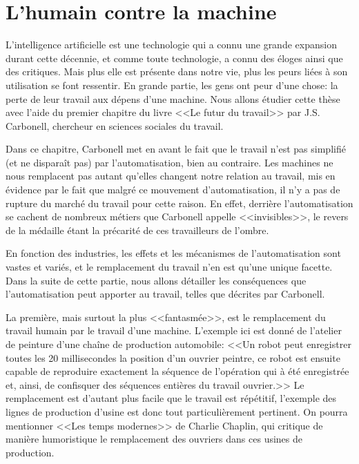 \documentclass[openany, 11pt]{memoir}
\begin{document}

\chapter{L'humain contre la machine}

L'intelligence artificielle est une technologie qui a connu une grande expansion durant cette décennie, et comme toute technologie, a connu des éloges ainsi que des critiques. Mais plus elle est présente dans notre vie, plus les peurs liées à son utilisation se font ressentir. En grande partie, les gens ont peur d'une chose: la perte de leur travail aux dépens d'une machine. Nous allons étudier cette thèse avec l'aide du premier chapitre du livre <<Le futur du travail>> \cite{futurtravail} par J.S. Carbonell, chercheur en sciences sociales du travail.

Dans ce chapitre, Carbonell met en avant le fait que le travail n'est pas simplifié (et ne disparaît pas) par l'automatisation, bien au contraire. Les machines ne nous remplacent pas autant qu'elles changent notre relation au travail, mis en évidence par le fait que malgré ce mouvement d'automatisation, il n'y a pas de rupture du marché du travail pour cette raison. En effet, derrière l'automatisation se cachent de nombreux métiers que Carbonell appelle <<invisibles>>, le revers de la médaille étant la précarité de ces travailleurs de l'ombre.

En fonction des industries, les effets et les mécanismes de l'automatisation sont vastes et variés, et le remplacement du travail n'en est qu'une unique facette. Dans la suite de cette partie, nous allons détailler les conséquences que l'automatisation peut apporter au travail, telles que décrites par Carbonell.

\bigskip
La première, mais surtout la plus <<fantasmée>>, est le remplacement du travail humain par le travail d'une machine. L'exemple ici est donné de l'atelier de peinture d'une chaîne de production automobile: <<Un robot peut enregistrer toutes les 20 millisecondes la position d'un ouvrier peintre, ce robot est ensuite capable de reproduire exactement la séquence de l'opération qui à été enregistrée et, ainsi, de confisquer des séquences entières du travail ouvrier.>> Le remplacement est d'autant plus facile que le travail est répétitif, l'exemple des lignes de production d'usine est donc tout particulièrement pertinent. On pourra mentionner <<Les temps modernes>> de Charlie Chaplin, qui critique de manière humoristique le remplacement des ouvriers dans ces usines de production.
\end{document}
